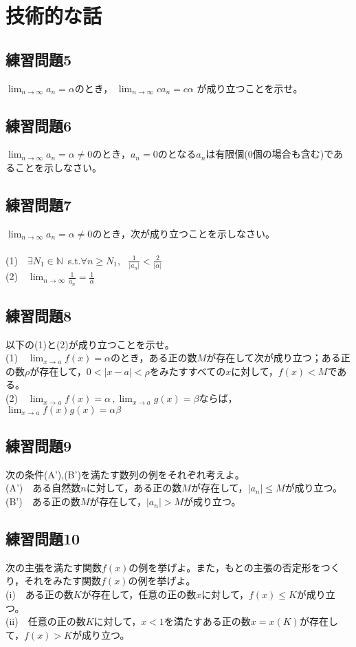 \documentclass[uplatex]{jsreport}
\begin{document}
  \chapter{技術的な話}
    \section{練習問題5}
    $ \displaystyle \lim_{n \to \infty}{a_n} = \alpha $のとき，
    $ \displaystyle \lim_{n \to \infty}{ca_n} = c \alpha $
    が成り立つことを示せ。
    \section{練習問題6}
    $ \displaystyle \lim_{n \to \infty}{a_n} = \alpha \neq 0$のとき，$ a_n=0 $のとなる$ a_n $は有限個(0個の場合も含む)であることを示しなさい。
    \section{練習問題7}
    $ \displaystyle \lim_{n \to \infty}{a_n} = \alpha \neq 0$のとき，次が成り立つことを示しなさい。\\
    \\
    (1)　$\exists N_1 \in \mathbb{N} \, $ s.t.$\forall n \geq N_1$, \, $ \displaystyle \frac{1}{|a_n|}<\frac{2}{|\alpha|}$ \\
    (2)　$\displaystyle \lim_{n \to \infty}{\frac{1}{a_n}}=\frac{1}{\alpha}$
    \section{練習問題8}
    以下の(1)と(2)が成り立つことを示せ。
    \\
    (1)　$ \displaystyle \lim_{x \to a}{f(x)} = \alpha$のとき，ある正の数$M$が存在して次が成り立つ；ある正の数$\rho$が存在して，$0<|x-a|<\rho$をみたすすべての$x$に対して，$f(x)<M$である。\\
    (2)　$ \displaystyle \lim_{x \to a}{f(x)} = \alpha \, , \displaystyle \lim_{x \to a}{g(x)} = \beta$ならば，$ \displaystyle \lim_{x \to a}{f(x)g(x)} = \alpha \beta $
    \section{練習問題9}
    次の条件(A'),(B')を満たす数列の例をそれぞれ考えよ。\\
    (A')　ある自然数$n$に対して，ある正の数$M$が存在して，$|a_n| \leq M$が成り立つ。\\
    (B')　ある正の数$M$が存在して，$|a_n|>M$が成り立つ。
    \section{練習問題10}
    次の主張を満たす関数$f(x)$の例を挙げよ。また，もとの主張の否定形をつくり，それをみたす関数$f(x)$の例を挙げよ。\\
    (i)　ある正の数$K$が存在して，任意の正の数$x$に対して，$f(x)\leq K$が成り立つ。\\
    (ii)　任意の正の数$K$に対して，$x<1$を満たすある正の数$x=x(K)$が存在して，$f(x)>K$が成り立つ。
\end{document}
